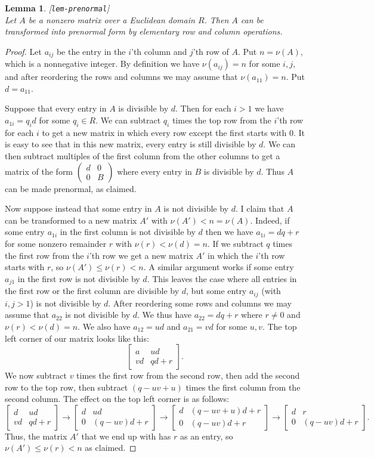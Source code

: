 \documentclass{amsart}
\newcommand{\lbl}[1]{\label{#1}\textup{[\texttt{#1}]}\ \\}
\newcommand{\lbl}{\label}
\newcommand{\bbm}       {\left[\begin{matrix}}
\newcommand{\ebm}       {\end{matrix}\right]}
\newcommand{\xra}       {\xrightarrow}
\newcommand{\blockmat}[4]{
 \left(\begin{array}{c|c} #1&#2 \\ \hline #3&#4\end{array}\right)}
\renewcommand{\:}{\colon}
\newtheorem{lemma}[theorem]{Lemma}
\theoremstyle{definition}
\begin{document}
\begin{lemma}\lbl{lem-prenormal}
 Let $A$ be a nonzero matrix over a Euclidean domain $R$.  Then $A$
 can be transformed into prenormal form by elementary row and column
 operations. 
\end{lemma}
\begin{proof}
 Let $a_{ij}$ be the entry in the $i$'th column and $j$'th row of $A$.
 Put $n=\nu(A)$, which is a nonnegative integer.  By definition we
 have $\nu(a_{ij})=n$ for some $i,j$, and after reordering the rows
 and columns we may assume that $\nu(a_{11})=n$.  Put $d=a_{11}$.   

 Suppose that every entry in $A$ is divisible by $d$.  Then for each
 $i>1$ we have $a_{1i}=q_id$ for some $q_i\in R$.  We can subtract
 $q_i$ times the top row from the $i$'th row for each $i$ to get a new
 matrix in which every row except the first starts with $0$.  It is
 easy to see that in this new matrix, every entry is still divisible
 by $d$.  We can then subtract multiples of the first column from the
 other columns to get a matrix of the form $\blockmat{d}{0}{0}{B}$
 where every entry in $B$ is divisible by $d$.  Thus $A$ can be made
 prenormal, as claimed.

 Now suppose instead that some entry in $A$ is not divisible by $d$.
 I claim that $A$ can be transformed to a new matrix $A'$ with
 $\nu(A')<n=\nu(A)$.  Indeed, if some entry $a_{1i}$ in the first
 column is not divisible by $d$ then we have $a_{1i}=dq+r$ for some
 nonzero remainder $r$ with $\nu(r)<\nu(d)=n$.  If we subtract $q$
 times the first row from the $i$'th row we get a new matrix $A'$ in
 which the $i$'th row starts with $r$, so $\nu(A')\leq\nu(r)<n$.  A
 similar argument works if some entry $a_{j1}$ in the first row is not
 divisible by $d$.  This leaves the case where all entries in the
 first row or the first column are divisible by $d$, but some entry
 $a_{ij}$ (with $i,j>1$) is not divisible by $d$.  After reordering
 some rows and columns we may assume that $a_{22}$ is not divisible by
 $d$.  We thus have $a_{22}=dq+r$ where $r\neq 0$ and
 $\nu(r)<\nu(d)=n$.  We also have $a_{12}=ud$ and $a_{21}=vd$ for some
 $u,v$.  The top left corner of our matrix looks like this:
 \[ \bbm a & u d \\ v d & q d + r \ebm. \]
 We now subtract $v$ times the first row from the second row, then add
 the second row to the top row, then subtract $(q-uv+u)$ times the
 first column from the second column.  The effect on the top left
 corner is as follows:
 \[ \bbm d & ud \\ vd & qd+r \ebm \xra{}
    \bbm d & ud \\ 0 & (q-uv)d + r \ebm \xra{}
    \bbm d & (q-uv+u)d + r \\ 0 & (q-uv)d + r \ebm \xra{}
    \bbm d & r \\ 0 & (q-uv)d+r \ebm.
 \]
 Thus, the matrix $A'$ that we end up with has $r$ as an entry, so
 $\nu(A')\leq\nu(r)<n$ as claimed.


\end{proof}
\end{document}
